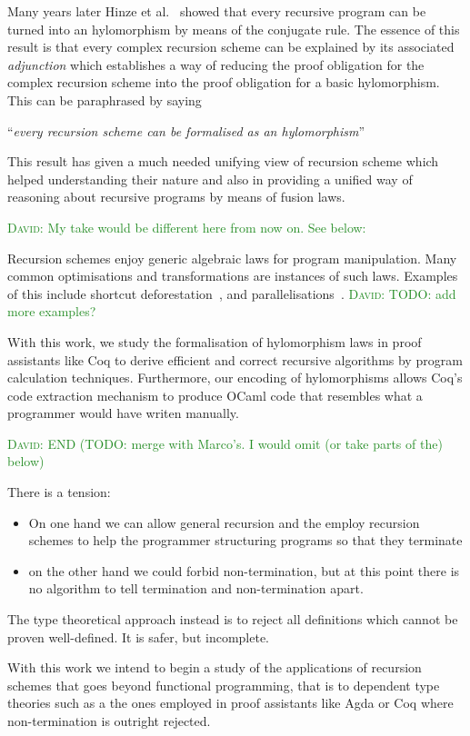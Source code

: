 \documentclass[a4paper, UKenglish, cleveref, autoref, thm-restate]{lipics-v2021}
\newcommand{\dcas}[1]{\textcolor{ForestGreen}{\textsc{David}: #1}}
\begin{document}
Many years later Hinze et al.~\cite{HinzeWG15} showed that every recursive
program can be turned into an hylomorphism by means of the conjugate rule. The
essence of this result is that every complex recursion scheme can be explained
by its associated \emph{adjunction} which establishes a way of reducing the
proof obligation for the complex recursion scheme into the proof obligation for
a basic hylomorphism. This can be paraphrased by saying
\begin{center}
  ``\emph{every recursion scheme can be formalised as an hylomorphism}''
\end{center}

This result has given a much needed unifying view of recursion scheme which
helped understanding their nature and also in providing a unified way of
reasoning about recursive programs by means of fusion laws.

\dcas{My take would be different here from now on. See below:}

Recursion schemes enjoy generic algebraic laws for program manipulation. Many
common optimisations and transformations are instances of such laws. Examples of
this include shortcut deforestation~\cite{TakanoM95}, and
parallelisations~\cite{Gibbons96:Third}. \dcas{TODO: add more examples?}

With this work, we study the formalisation of hylomorphism laws in proof
assistants like Coq to derive efficient and correct recursive algorithms by
program calculation techniques. Furthermore, our encoding of hylomorphisms
allows Coq's code extraction mechanism to produce OCaml code that resembles what
a programmer would have writen manually.

\dcas{END (TODO: merge with Marco's. I would omit (or take parts of the) below)}

There is a tension:
\begin{itemize}
  \item On one hand we can allow general recursion and the employ recursion
schemes to help the programmer structuring programs so that they terminate
  \item on the other hand we could forbid non-termination, but at this point
there is no algorithm to tell termination and non-termination apart.
\end{itemize}

The type theoretical approach instead is to reject all definitions which cannot
be proven well-defined. It is safer, but incomplete.

With this work we intend to begin a study of the applications of recursion
schemes that goes beyond functional programming, that is to dependent type
theories such as a the ones employed in proof assistants like Agda or Coq where
non-termination is outright rejected.
\end{document}
